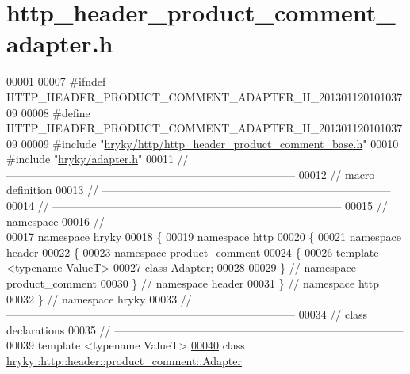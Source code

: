 \hypertarget{http__header__product__comment__adapter_8h_source}{\section{http\-\_\-header\-\_\-product\-\_\-comment\-\_\-adapter.\-h}
}

\begin{DoxyCode}
00001 
00007 \textcolor{preprocessor}{#ifndef HTTP\_HEADER\_PRODUCT\_COMMENT\_ADAPTER\_H\_20130112010103709}
00008 \textcolor{preprocessor}{}\textcolor{preprocessor}{#define HTTP\_HEADER\_PRODUCT\_COMMENT\_ADAPTER\_H\_20130112010103709}
00009 \textcolor{preprocessor}{}\textcolor{preprocessor}{#include "\hyperlink{http__header__product__comment__base_8h}{hryky/http/http_header_product_comment_base.h}"}
00010 \textcolor{preprocessor}{#include "\hyperlink{adapter_8h}{hryky/adapter.h}"}
00011 \textcolor{comment}{//
      ------------------------------------------------------------------------------}
00012 \textcolor{comment}{// macro definition}
00013 \textcolor{comment}{//
      ------------------------------------------------------------------------------}
00014 \textcolor{comment}{//
      ------------------------------------------------------------------------------}
00015 \textcolor{comment}{// namespace}
00016 \textcolor{comment}{//
      ------------------------------------------------------------------------------}
00017 \textcolor{keyword}{namespace }hryky
00018 \{
00019 \textcolor{keyword}{namespace }http
00020 \{
00021 \textcolor{keyword}{namespace }header
00022 \{
00023 \textcolor{keyword}{namespace }product\_comment
00024 \{
00026     \textcolor{keyword}{template} <\textcolor{keyword}{typename} ValueT>
00027     \textcolor{keyword}{class }Adapter;
00028 
00029 \} \textcolor{comment}{// namespace product\_comment}
00030 \} \textcolor{comment}{// namespace header}
00031 \} \textcolor{comment}{// namespace http}
00032 \} \textcolor{comment}{// namespace hryky}
00033 \textcolor{comment}{//
      ------------------------------------------------------------------------------}
00034 \textcolor{comment}{// class declarations}
00035 \textcolor{comment}{//
      ------------------------------------------------------------------------------}
00039 \textcolor{comment}{}\textcolor{keyword}{template} <\textcolor{keyword}{typename} ValueT>
\hypertarget{http__header__product__comment__adapter_8h_source_l00040}{}\hyperlink{classhryky_1_1http_1_1header_1_1product__comment_1_1_adapter}{00040} \textcolor{keyword}{class }\hyperlink{classhryky_1_1http_1_1header_1_1product__comment_1_1_adapter}{hryky::http::header::product_comment::Adapter}

\end{DoxyCode}
